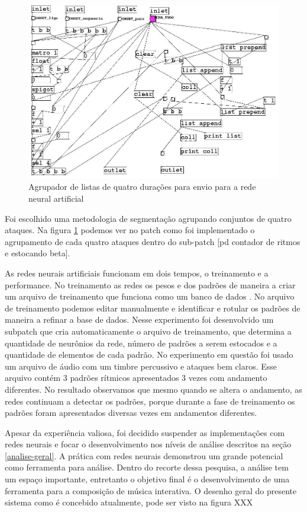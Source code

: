 \documentclass{ppgmus}
\begin{document}
  
\begin{figure}
\includegraphics[scale=.5]{fann2}
\caption{Agrupador de listas de quatro durações para envio para a rede neural artificial}
\label{fann2}
\end{figure} 

Foi escolhido uma metodologia de segmentação agrupando conjuntos de quatro ataques. 
Na figura \ref{fann2} podemos ver no patch como foi implementado 
o agrupamento de cada quatro  ataques dentro do sub-patch [pd contador de ritmos e estocando beta].

As redes neurais artificiais funcionam em dois tempos, o treinamento e a performance. No treinamento as redes os pesos e 
dos padrões de maneira a criar um arquivo de treinamento que funciona como um banco de dados . No arquivo de treinamento 
podemos editar manualmente e identificar e rotular os padrões de maneira a refinar a base de dados. Nesse experimento foi 
desenvolvido um subpatch que cria automaticamente o arquivo de treinamento, que determina a quantidade de neurônios da 
rede, número de padrões a serem estocados e a quantidade de elementos de cada padrão.
   No experimento em questão foi usado um arquivo de áudio com um timbre percussivo e ataques bem claros. Esse arquivo 
contém 3 padrões rítmicos apresentados 3 vezes com  andamento diferentes. No resultado observamos que mesmo quando se 
altera o andamento, as redes continuam a detectar os padrões, porque durante a fase de treinamento os padrões foram 
apresentados diversas vezes em andamentos diferentes.


Apesar da experiência valiosa, foi decidido suspender as implementações com redes neurais e
focar o desenvolvimento nos níveis de análise descritos na seção \ref{analise-geral}.
A prática com redes neurais demonstrou um grande potencial como ferramenta para análise.
Dentro do recorte dessa pesquisa, a análise tem um espaço importante, entretanto o objetivo
final é o desenvolvimento de uma ferramenta para a composição de música interativa.
O desenho geral do presente sistema como é concebido atualmente, pode ser visto na 
figura XXX
\end{document}
